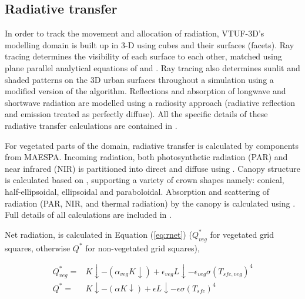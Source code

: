 \documentclass[final,3p,times,authoryear]{elsarticle}
\begin{document}
\subsection{Radiative transfer}\label{sec:radiativetransfer}

In order to track the movement and allocation of radiation, VTUF-3D’s modelling domain is built up in 3-D using cubes and their surfaces (facets). Ray tracing determines the visibility of each surface to each other, matched using plane parallel analytical equations of \cite{Siegel2001} and \cite{Hottel1967}. Ray tracing also determines sunlit and shaded patterns on the 3D urban surfaces throughout a simulation using a modified version of the \cite{Soux2004} algorithm. Reflections and absorption of longwave and shortwave radiation are modelled using a radiosity approach (radiative reflection and emission treated as perfectly diffuse). All the specific details of these radiative transfer calculations are contained in \cite{Krayenhoff2007}.

For vegetated parts of the domain, radiative transfer is calculated by components from MAESPA. Incoming radiation, both photosynthetic radiation (PAR) and near infrared (NIR) is partitioned into direct and diffuse using \cite{Weiss1985}. Canopy structure is calculated based on \cite{Wang1990}, supporting a variety of crown shapes namely: conical, half-ellipsoidal, ellipsoidal and paraboloidal. Absorption and scattering of radiation (PAR, NIR, and thermal radiation) by the canopy is calculated using \cite{Norman1979}. Full details of all calculations are included in \cite{Duursma2012}.

Net radiation, is calculated in Equation (\ref{eq:rnet}) ($Q^{*}_{veg}$ for vegetated grid squares, otherwise $Q^{*}$ for non-vegetated grid squares), 


\begin{equation}\label{eq:rnet}
\begin{split}
Q^{*}_{veg} =& K\downarrow - (\alpha _{veg} K\downarrow) + \epsilon _{veg} L\downarrow - \epsilon _{veg} \sigma  (T_{sfc,veg}) ^{4} 
\\
Q^{*} =& K\downarrow - (\alpha K\downarrow) + \epsilon L\downarrow - \epsilon \sigma  (T_{sfc}) ^{4} 
\end{split}
\end{equation}
\end{document}
